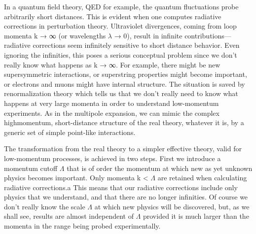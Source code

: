 \documentclass[cs4size,titlepage,twoside]{ctexart}
\begin{document}
\begin{appendices}
In a quantum field theory, QED for example, the quantum fluctuations
probe arbitrarily short distances. This is evident when one computes radiative
corrections in perturbation theory. Ultraviolet divergences, coming from loop
momenta k → ∞ (or wavelengths $\lambda$ → 0), result in infinite contributions—
radiative corrections seem infinitely sensitive to short distance behavior. Even
ignoring the infinities, this poses a serious conceptual problem since we don't
really know what happens as k → ∞. For example, there might be new supersymmetric
interactions, or superstring properties might become important,
or electrons and muons might have internal structure. The situation is saved by renormalization theory which tells us that we don't really need to know
what happens at very large momenta in order to understand low-momentum
experiments. As in the multipole expansion, we can mimic the complex highmomentum,
short-distance structure of the real theory, whatever it is, by a
generic set of simple point-like interactions.

The transformation from the real theory to a simpler effective theory, valid
for low-momentum processes, is achieved in two steps. First we introduce a
momentum cutoff $\Lambda$ that is of order the momentum at which new as yet unknown
physics becomes important. Only momenta k < $\Lambda$ are retained when
calculating radiative corrections.a This means that our radiative corrections
include only physics that we understand, and that there are no longer infinities.
Of course we don't really know the scale $\Lambda$ at which new physics will be
discovered, but, as we shall see, results are almost independent of $\Lambda$ provided
it is much larger than the momenta in the range being probed experimentally.


\end{appendices}
\end{document}

